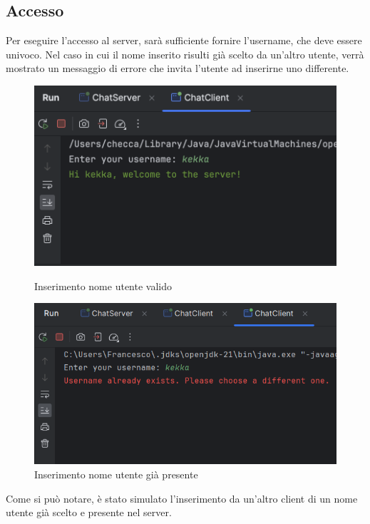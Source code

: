 \subsection{Accesso}
Per eseguire l'accesso al server, sarà sufficiente fornire l'username, che deve essere univoco. Nel caso in cui il nome inserito risulti già scelto da un'altro utente, verrà mostrato un messaggio di errore che invita l'utente ad inserirne uno differente.
\begin{figure}[h]
  \centering
  \begin{minipage}{0.45\textwidth}
    \includegraphics[width=\linewidth]{imagens/outputs/2.png}
    \caption{Inserimento nome utente valido}
  \end{minipage}\hfill
  \begin{minipage}{0.45\textwidth}
    \includegraphics[width=\linewidth]{imagens/outputs/2_2.png}
    \caption{Inserimento nome utente già presente}
  \end{minipage}\hfill
\end{figure}
\newline
Come si può notare, è stato simulato l'inserimento da un'altro client di un nome utente già scelto e presente nel server.
